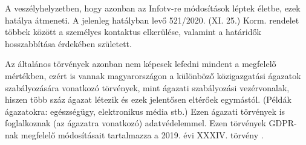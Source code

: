 A veszélyhelyzetben, hogy azonban az Infotv-re módosítások léptek életbe, ezek hatálya átmeneti. \cite{521/2020} A jelenleg hatályban levő 521/2020. (XI. 25.) Korm. rendelet többek között a személyes kontaktus elkerülése, valamint a határidők hosszabbítása érdekében született.

Az általános törvények azonban nem képesek lefedni mindent a megfelelő mértékben, ezért is vannak magyarországon a különböző közigazgatási ágazatok szabályozására vonatkozó törvények, mint ágazati szabályozási vezérvonalak, hiszen több száz ágazat létezik és ezek jelentősen eltérőek egymástól. (Példák ágazatokra: egészségügy, elektronikus média stb.) Ezen ágazati törvények is foglalkoznak (az ágazatra vonatkozó) adatvédelemmel. Ezen törvények GDPR-nak megfelelő módosításait tartalmazza a 2019. évi XXXIV. törvény \cite{2019-XXXIV-torveny}.